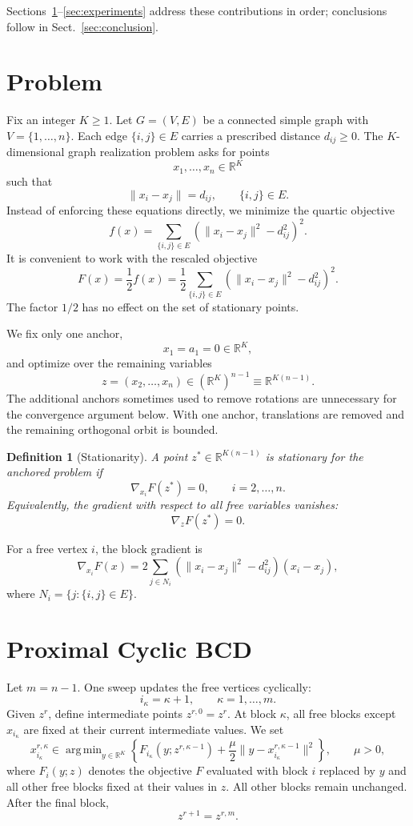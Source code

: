 \documentclass[11pt]{article}
\newtheorem{definition}{Definition}
\DeclareMathOperator*{\argmin}{arg\,min}
\begin{document}
Sections~\ref{sec:problem}--\ref{sec:experiments} address these contributions in order; conclusions follow in Sect.~\ref{sec:conclusion}.

\section{Problem}
\label{sec:problem}

Fix an integer \(K\ge1\).  Let \(G=(V,E)\) be a connected simple graph with \(V=\{1,\ldots,n\}\).  Each edge \(\{i,j\}\in E\) carries a prescribed distance \(d_{ij}\ge 0\).  The \(K\)-dimensional graph realization problem asks for points
\[
    x_1,\ldots,x_n\in \mathbb R^K
\]
such that
\[
    \|x_i-x_j\|=d_{ij},\qquad \{i,j\}\in E.
\]
Instead of enforcing these equations directly, we minimize the quartic objective
\[
    f(x)=\sum_{\{i,j\}\in E}\left(\|x_i-x_j\|^2-d_{ij}^2\right)^2.
\]
It is convenient to work with the rescaled objective
\[
    F(x)=\frac12 f(x)
    =
    \frac12\sum_{\{i,j\}\in E}\left(\|x_i-x_j\|^2-d_{ij}^2\right)^2.
\]
The factor \(1/2\) has no effect on the set of stationary points.

We fix only one anchor,
\[
    x_1=a_1=0\in\mathbb R^K,
\]
and optimize over the remaining variables
\[
    z=(x_2,\ldots,x_n)\in (\mathbb R^K)^{n-1}\equiv \mathbb R^{K(n-1)}.
\]
The additional anchors sometimes used to remove rotations are unnecessary for the convergence argument below.  With one anchor, translations are removed and the remaining orthogonal orbit is bounded.

\begin{definition}[Stationarity]
A point \(z^*\in\mathbb R^{K(n-1)}\) is stationary for the anchored problem if
\[
    \nabla_{x_i}F(z^*)=0,\qquad i=2,\ldots,n.
\]
Equivalently, the gradient with respect to all free variables vanishes:
\[
    \nabla_z F(z^*)=0.
\]
\end{definition}

For a free vertex \(i\), the block gradient is
\[
    \nabla_{x_i}F(x)
    =
    2\sum_{j\in N_i}
    \left(\|x_i-x_j\|^2-d_{ij}^2\right)(x_i-x_j),
\]
where \(N_i=\{j:\{i,j\}\in E\}\).

\section{Proximal Cyclic BCD}
\label{sec:algorithm}

Let \(m=n-1\).  One sweep updates the free vertices cyclically:
\[
    i_\kappa=\kappa+1,\qquad \kappa=1,\ldots,m.
\]
Given \(z^r\), define intermediate points \(z^{r,0}=z^r\).  At block \(\kappa\), all free blocks except \(x_{i_\kappa}\) are fixed at their current intermediate values.  We set
\[
    x_{i_\kappa}^{r,\kappa}
    \in
    \argmin_{y\in\mathbb R^K}
    \left\{
        F_{i_\kappa}(y;z^{r,\kappa-1})
        +
        \frac{\mu}{2}
        \|y-x_{i_\kappa}^{r,\kappa-1}\|^2
    \right\},
    \qquad \mu>0,
\]
where \(F_i(y;z)\) denotes the objective \(F\) evaluated with block \(i\) replaced by \(y\) and all other free blocks fixed at their values in \(z\).  All other blocks remain unchanged.  After the final block,
\[
    z^{r+1}=z^{r,m}.
\]
\end{document}
